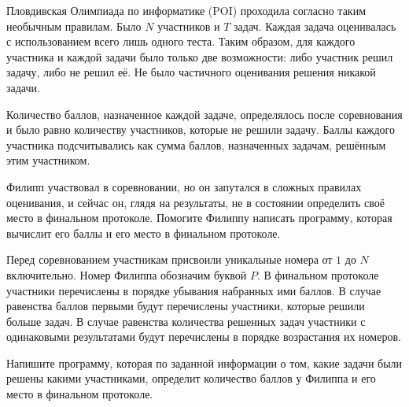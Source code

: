 Пловдивская Олимпиада по информатике (POI) проходила согласно таким необычным правилам.
Было $N$ участников и $T$ задач. Каждая задача оценивалась с использованием всего лишь одного теста. Таким образом, для каждого участника и каждой задачи было только две
возможности: либо участник решил задачу, либо не решил её. Не было частичного оценивания решения никакой задачи.

Количество баллов, назначенное каждой задаче, определялось после соревнования и было равно количеству участников, которые не решили задачу. Баллы каждого участника подсчитывались как сумма баллов, назначенных задачам, решённым этим участником.

Филипп участвовал в соревновании, но он запутался в сложных правилах оценивания, и сейчас он, глядя на результаты, не в состоянии определить своё место в финальном протоколе.
Помогите Филиппу написать программу, которая вычислит его баллы и его место в финальном протоколе.

Перед соревнованием участникам присвоили уникальные номера от $1$ до $N$ включительно.
Номер Филиппа обозначим буквой $P$. В финальном протоколе участники перечислены в порядке убывания набранных ими баллов. В случае равенства баллов первыми будут перечислены участники, которые решили больше задач. В случае равенства количества решенных задач участники с одинаковыми результатами будут перечислены в порядке возрастания их номеров.

Напишите программу, которая по заданной информации о том, какие задачи были решены какими участниками, определит количество баллов у Филиппа и его место в финальном протоколе.
